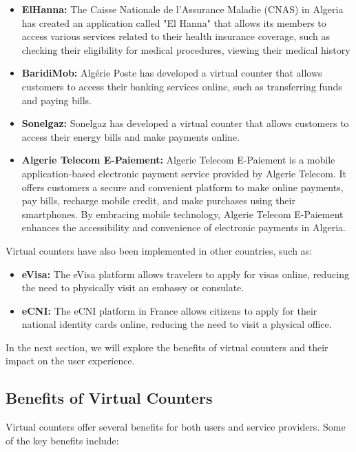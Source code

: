 \begin{itemize}
  \item \textbf{ElHanna:} The Caisse Nationale de l'Assurance Maladie (CNAS) in Algeria has created an application called "El Hanna" that allows its members to access various services related to their health insurance coverage, such as checking their eligibility for medical procedures, viewing their medical history
  \item \textbf{BaridiMob:} Algérie Poste has developed a virtual counter that allows customers to access their banking services online, such as transferring funds and paying bills.
  \item \textbf{Sonelgaz:} Sonelgaz has developed a virtual counter that allows customers to access their energy bills and make payments online.
  \item \textbf{Algerie Telecom E-Paiement:} Algerie Telecom E-Paiement is a mobile application-based electronic payment service provided by Algerie Telecom. It offers customers a secure and convenient platform to make online payments, pay bills, recharge mobile credit, and make purchases using their smartphones. By embracing mobile technology, Algerie Telecom E-Paiement enhances the accessibility and convenience of electronic payments in Algeria.
\end{itemize}

Virtual counters have also been implemented in other countries, such as:

\begin{itemize}
  \item \textbf{eVisa:} The eVisa platform allows travelers to apply for visas online, reducing the need to physically visit an embassy or consulate.
  \item \textbf{eCNI:} The eCNI platform in France allows citizens to apply for their national identity cards online, reducing the need to visit a physical office.
\end{itemize}

In the next section, we will explore the benefits of virtual counters and their impact on the user experience.

\subsection{Benefits of Virtual Counters}
Virtual counters offer several benefits for both users and service providers. Some of the key benefits include:

